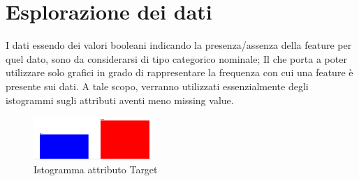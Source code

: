 \section{Esplorazione dei dati}
I dati essendo dei valori booleani indicando la presenza/assenza della feature per quel dato, sono da considerarsi di tipo categorico nominale; Il che porta a poter utilizzare solo grafici in grado di rappresentare la frequenza con cui una feature è presente sui dati. A tale scopo, verranno utilizzati essenzialmente degli istogrammi sugli attributi aventi meno missing value.

\begin{figure}[hbtp]
 	\centering
 	\includegraphics[width=0.4\textwidth]{./images/histogram/target.png}
 	\caption{Istogramma attributo Target}
 	\label{TargetHist}
\end{figure}

  
